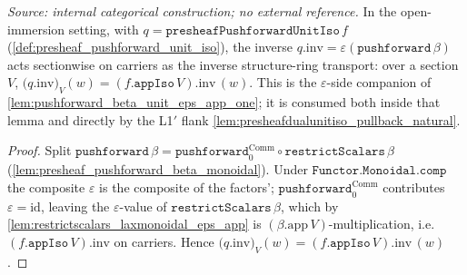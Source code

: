 \begin{lemma}

\leanok
[Carrier-value of the pushforward comparator inverse $q.\mathrm{inv} = \varepsilon$]
  \label{lem:presheaf_pushforward_unit_iso_inv_app}
  \textit{Source: internal categorical construction; no external reference.}
  In the open-immersion setting, with \(q = \mathtt{presheafPushforwardUnitIso}\,f\)
  (\cref{def:presheaf_pushforward_unit_iso}), the inverse \(q.\mathrm{inv} =
  \varepsilon(\mathtt{pushforward}\,\beta)\) acts sectionwise on carriers as the inverse structure-ring
  transport: over a section \(V\),
  \(\bigl(q.\mathrm{inv}\bigr)_V (w) = (f.\mathtt{appIso}\,V).\mathrm{inv}\,(w)\).
  This is the \(\varepsilon\)-side companion of \cref{lem:pushforward_beta_unit_eps_app_one}; it is
  consumed both inside that lemma and directly by the L1\('\) flank
  \cref{lem:presheafdualunitiso_pullback_natural}.
\end{lemma}
\begin{proof}
  \leanok
  Split \(\mathtt{pushforward}\,\beta = \mathtt{pushforward}_0^{\mathrm{Comm}} \circ
  \mathtt{restrictScalars}\,\beta\) (\cref{lem:presheaf_pushforward_beta_monoidal}). Under
  \(\mathtt{Functor.Monoidal.comp}\) the composite \(\varepsilon\) is the composite of the factors';
  \(\mathtt{pushforward}_0^{\mathrm{Comm}}\) contributes \(\varepsilon = \mathrm{id}\), leaving the
  \(\varepsilon\)-value of \(\mathtt{restrictScalars}\,\beta\), which by
  \cref{lem:restrictscalars_laxmonoidal_eps_app} is \((\beta.\mathrm{app}\,V)\)-multiplication, i.e.
  \((f.\mathtt{appIso}\,V).\mathrm{inv}\) on carriers. Hence
  \(\bigl(q.\mathrm{inv}\bigr)_V (w) = (f.\mathtt{appIso}\,V).\mathrm{inv}\,(w)\).
\end{proof}

